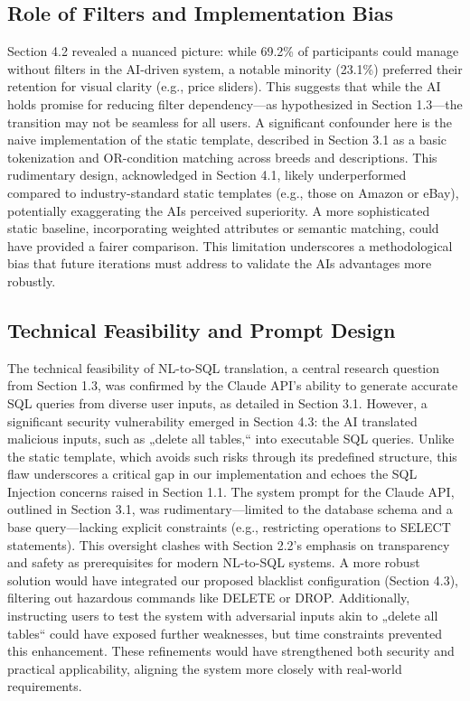 \documentclass[../../submission.tex]{subfiles}
\begin{document}
\subsection{Role of Filters and Implementation Bias}
Section 4.2 revealed a nuanced picture: while 69.2\% of participants could manage without 
filters in the AI-driven system, a notable minority (23.1\%) preferred their retention for visual 
clarity (e.g., price sliders). This suggests that while the AI holds promise for reducing filter 
dependency—as hypothesized in Section 1.3—the transition may not be seamless for all users. A 
significant confounder here is the naive implementation of the static template, described in Section 
3.1 as a basic tokenization and OR-condition matching across breeds and descriptions. This rudimentary 
design, acknowledged in Section 4.1, likely underperformed compared to industry-standard static 
templates (e.g., those on Amazon or eBay), potentially exaggerating the AIs perceived superiority. 
A more sophisticated static baseline, incorporating weighted attributes or semantic matching, could 
have provided a fairer comparison. This limitation underscores a methodological 
bias that future iterations must address to validate the AIs advantages more robustly.

\subsection{Technical Feasibility and Prompt Design}
The technical feasibility of NL-to-SQL translation, a central research 
question from Section 1.3, was confirmed by the Claude API’s ability to 
generate accurate SQL queries from diverse user inputs, as detailed in 
Section 3.1. However, a significant security vulnerability emerged in 
Section 4.3: the AI translated malicious inputs, such as „delete all tables,“ 
into executable SQL queries. Unlike the static template, which avoids 
such risks through its predefined structure, this flaw underscores a 
critical gap in our implementation and echoes the SQL Injection concerns 
raised in Section 1.1. The system prompt for the Claude API, outlined in 
Section 3.1, was rudimentary—limited to the database schema and a base 
query—lacking explicit constraints 
(e.g., restricting operations to SELECT statements). This 
oversight clashes with Section 2.2’s emphasis on transparency
and safety as prerequisites for modern NL-to-SQL systems. A more 
robust solution would have integrated our proposed blacklist 
configuration (Section 4.3), filtering 
out hazardous commands like DELETE or DROP. Additionally, instructing 
users to test the system with adversarial inputs akin to „delete all tables“ 
could have exposed further weaknesses, but time constraints prevented 
this enhancement. These refinements would have strengthened both 
security and practical applicability, aligning the system more 
closely with real-world requirements.
\end{document}
